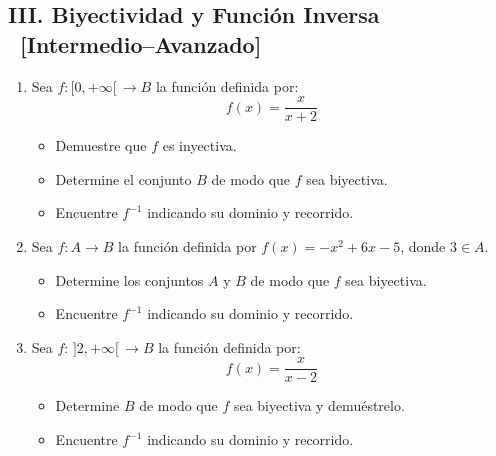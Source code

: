 \documentclass[letterpaper, 12pt]{article}
\begin{document}
\vspace{0.5cm}\newpage

\subsection*{III.\; Biyectividad y Función Inversa \
    {\color{azulFuerte}\textbf{[Intermedio–Avanzado]}}}

\begin{enumerate}[label=\color{azulFuerte}\bfseries\arabic*., leftmargin=*, itemsep=1.4em, start=11]

\item Sea $f:[0,+\infty[\,\to B$ la función definida por:
\[
    f(x) = \frac{x}{x+2}
\]
\begin{itemize}
    \item Demuestre que $f$ es inyectiva.
    \item Determine el conjunto $B$ de modo que $f$ sea biyectiva.
    \item Encuentre $f^{-1}$ indicando su dominio y recorrido.
\end{itemize}

\item Sea $f:A\to B$ la función definida por $f(x)=-x^{2}+6x-5$, donde $3\in A$.
\begin{itemize}
    \item Determine los conjuntos $A$ y $B$ de modo que $f$ sea biyectiva.
    \item Encuentre $f^{-1}$ indicando su dominio y recorrido.
\end{itemize}

\item Sea $f:\,]2,+\infty[\,\to B$ la función definida por:
\[
    f(x) = \frac{x}{x-2}
\]
\begin{itemize}
    \item Determine $B$ de modo que $f$ sea biyectiva y demuéstrelo.
    \item Encuentre $f^{-1}$ indicando su dominio y recorrido.
\end{itemize}

\end{enumerate}
\end{document}

